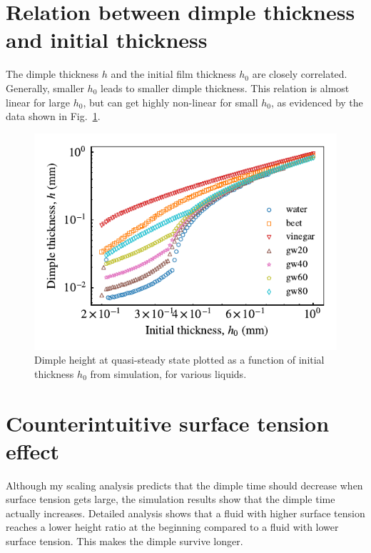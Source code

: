 \documentclass[aps,preprint]{revtex4-2}
\begin{document}
\newpage

\section{Relation between dimple thickness and initial thickness}

The dimple thickness $h$ and the initial film thickness $h_0$ are closely correlated. 
Generally, smaller $h_0$ leads to smaller dimple thickness. 
This relation is almost linear for large $h_0$, but can get highly non-linear for small $h_0$, as evidenced by the data shown in Fig.~\ref{fig:dimple-thickness-relation}.

\begin{figure}[ht]
    \centering
    \includegraphics[width=\linewidth]{Figures/dimple_thickness}
    \caption{
    Dimple height at quasi-steady state plotted as a function of initial thickness $h_0$ from simulation, for various liquids. 
    }
    \label{fig:dimple-thickness-relation}
\end{figure}

\newpage

\section{Counterintuitive surface tension effect}

Although my scaling analysis predicts that the dimple time should decrease when surface tension gets large, the simulation results show that the dimple time actually increases. Detailed analysis shows that a fluid with higher surface tension reaches a lower height ratio at the beginning compared to a fluid with lower surface tension. This makes the dimple survive longer.
\end{document}
